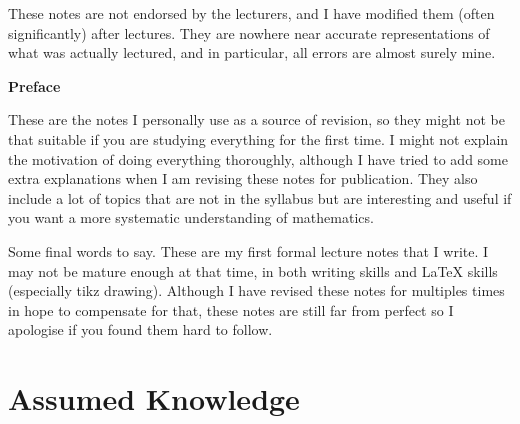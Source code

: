 \documentclass{article}
\theoremstyle{plain}\theoremheaderfont{\normalfont\itshape}\theorembodyfont{\rmfamily}\theoremseparator{.}\newtheorem*{rem}{Remark}\newtheorem*{ex}{Example}\newtheorem*{proof}{Proof}\newtheorem*{altp}{Alternative proof}
\theoremstyle{plain}\theoremheaderfont{\normalfont\bfseries}\theorembodyfont{\rmfamily}\theoremseparator{.}\newtheorem{thm}{Theorem}[section]\newtheorem{lem}[thm]{Lemma}\newtheorem{prop}[thm]{Proposition}\newtheorem*{cor}{Corollary}\newtheorem{defn}[thm]{Definition}\newtheorem{clm}[thm]{Claim}\newtheorem{clminproof}{Claim}
\theoremstyle{break}\theoremheaderfont{\normalfont\itshape}\theorembodyfont{\rmfamily}\theoremseparator{.\medskip}\newtheorem*{proofskip}{Proof}\newtheorem*{exs}{Examples}\newtheorem*{rems}{Remarks}
\theoremstyle{break}\theoremheaderfont{\normalfont\bfseries}\theorembodyfont{\rmfamily}\theoremseparator{.\medskip}\newtheorem{lemskip}[thm]{Lemma}\newtheorem{defnskip}[thm]{Definition}\newtheorem{propskip}[thm]{Proposition}\newtheorem{thmskip}[thm]{Theorem}
\numberwithin{equation}{section}
\begin{document}
	These notes are not endorsed by the lecturers, and I have modified them (often
	significantly) after lectures. They are nowhere near accurate representations of what was actually lectured, and in particular, all errors are almost surely mine.

	\vskip 30pt

    \begin{center}
		\textbf{\Large{Preface}}
	\end{center}
    These are the notes I personally use as a source of revision, so they might not be that suitable if you are studying everything for the first time. I might not explain the motivation of doing everything thoroughly, although I have tried to add some extra explanations when I am revising these notes for publication. They also include a lot of topics that are not in the syllabus but are interesting and useful if you want a more systematic understanding of mathematics.

	Some final words to say. These are my first formal lecture notes that I write. I may not be mature enough at that time, in both writing skills and {\LaTeX} skills (especially tikz drawing). Although I have revised these notes for multiples times in hope to compensate for that, these notes are still far from perfect so I apologise if you found them hard to follow.
	
	\normalsize
	\newpage
	\tableofcontents
	\newpage

	\section{Assumed Knowledge}
\end{document}
